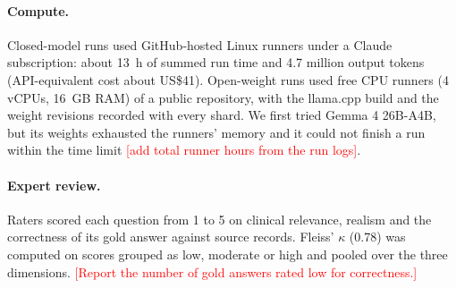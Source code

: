 \documentclass[11pt]{article}
\newcommand{\todo}[1]{\textcolor{red}{[#1]}}
\begin{document}
\paragraph{Compute.} Closed-model runs used GitHub-hosted Linux runners under a Claude subscription: about 13~h of summed run time and 4.7 million output tokens (API-equivalent cost about US\$41). Open-weight runs used free CPU runners (4 vCPUs, 16~GB RAM) of a public repository, with the llama.cpp build and the weight revisions recorded with every shard. We first tried Gemma 4 26B-A4B, but its weights exhausted the runners' memory and it could not finish a run within the time limit \todo{add total runner hours from the run logs}.

\paragraph{Expert review.} Raters scored each question from 1 to 5 on clinical relevance, realism and the correctness of its gold answer against source records. Fleiss' $\kappa$ (0.78) was computed on scores grouped as low, moderate or high and pooled over the three dimensions. \todo{Report the number of gold answers rated low for correctness.}
\end{document}
